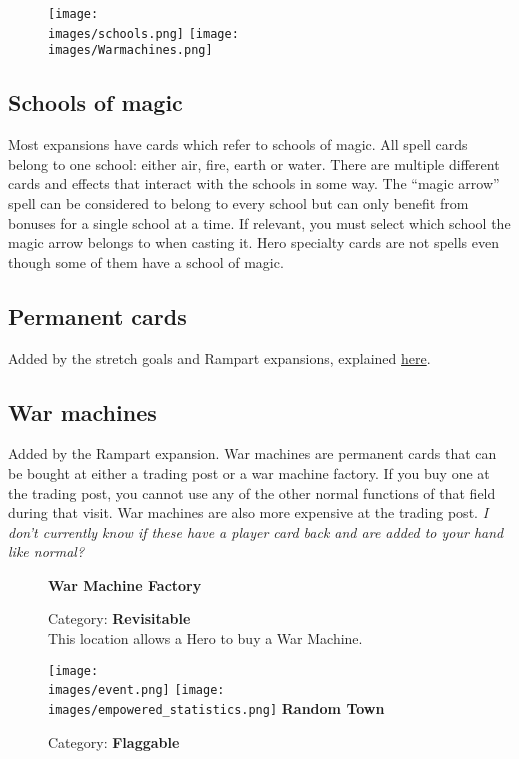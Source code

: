 \begin{wrapfigure}{R}{0.5\textwidth}
  \begin{center}
    \texttt{[image: \\images/schools.png]}
    \texttt{[image: \\images/Warmachines.png]}
  \end{center}
\end{wrapfigure}
\subsection*{Schools of magic}
Most expansions have cards which refer to schools of magic. All spell cards belong to one school: either air, fire, earth or water. There are multiple different cards and effects that interact with the schools in some way. The “magic arrow” spell can be considered to belong to every school but can only benefit from bonuses for a single school at a time. If relevant, you must select which school the magic arrow belongs to when casting it. Hero specialty cards are not spells even though some of them have a school of magic.
\subsection*{Permanent cards}
Added by the stretch goals and Rampart expansions, explained \hyperlink{Playerdecks}{here}.
\subsection*{War machines}
Added by the Rampart expansion. War machines are permanent cards that can be bought at either a trading post or a war machine factory. If you buy one at the trading post, you cannot use any of the other normal functions of that field during that visit. War machines are also more expensive at the trading post. \textit{I don't currently know if these have a player card back and are added to your hand like normal?}\par
\begin{wrapfigure}{r}{0.5\textwidth}
  \textbf{War Machine Factory}\\
  \caption{Category: \textbf{Revisitable}\\This location allows a Hero to buy a War Machine.}
\end{wrapfigure}

\clearpage
\begin{wrapfigure}{r}{0.5\textwidth}
    \begin{center}
    \texttt{[image: \\images/event.png]}
    \texttt{[image: \\images/empowered\_statistics.png]}
    \bigbreak
    \textbf{Random Town}
    \smallbreak
    \caption{Category: \textbf{Flaggable}}
    \end{center}
\end{wrapfigure}

